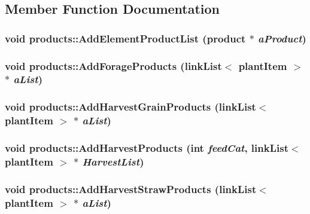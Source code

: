 \subsection{Member Function Documentation}
\hypertarget{classproducts_ae429268b58f42c812d1eacc2954500b2}{
\subsubsection[{AddElementProductList}]{\setlength{\rightskip}{0pt plus 5cm}void products::AddElementProductList ({\bf product} $\ast$ {\em aProduct})}}
\label{classproducts_ae429268b58f42c812d1eacc2954500b2}
\hypertarget{classproducts_aa66cc6700d84a9bb9a88915d4b8156de}{
\subsubsection[{AddForageProducts}]{\setlength{\rightskip}{0pt plus 5cm}void products::AddForageProducts ({\bf linkList}$<$ {\bf plantItem} $>$ $\ast$ {\em aList})}}
\label{classproducts_aa66cc6700d84a9bb9a88915d4b8156de}
\hypertarget{classproducts_a378d30f83ce852844803d549e13eee31}{
\subsubsection[{AddHarvestGrainProducts}]{\setlength{\rightskip}{0pt plus 5cm}void products::AddHarvestGrainProducts ({\bf linkList}$<$ {\bf plantItem} $>$ $\ast$ {\em aList})}}
\label{classproducts_a378d30f83ce852844803d549e13eee31}
\hypertarget{classproducts_a4b770aa23aa5b30ceec044586c6d02b9}{
\subsubsection[{AddHarvestProducts}]{\setlength{\rightskip}{0pt plus 5cm}void products::AddHarvestProducts (int {\em feedCat}, \/  {\bf linkList}$<$ {\bf plantItem} $>$ $\ast$ {\em HarvestList})}}
\label{classproducts_a4b770aa23aa5b30ceec044586c6d02b9}
\hypertarget{classproducts_a64468cfd7fcbe94794b6d22a59781781}{
\subsubsection[{AddHarvestStrawProducts}]{\setlength{\rightskip}{0pt plus 5cm}void products::AddHarvestStrawProducts ({\bf linkList}$<$ {\bf plantItem} $>$ $\ast$ {\em aList})}}
